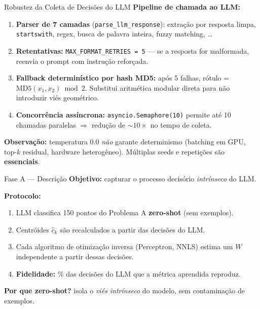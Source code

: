 \documentclass[aspectratio=169,10pt]{beamer}
\begin{document}
\begin{frame}{Robustez da Coleta de Decis\~oes do LLM}
  \footnotesize
  \textbf{Pipeline de chamada ao LLM:}
  \begin{enumerate}
    \item \textbf{Parser de 7 camadas} (\texttt{parse\_llm\_response}): extra\c{c}\~ao por resposta limpa, \texttt{startswith}, regex, busca de palavra inteira, fuzzy matching, \dots
    \item \textbf{Retentativas:} \texttt{MAX\_FORMAT\_RETRIES = 5} --- se a resposta for malformada, reenvia o prompt com instru\c{c}\~ao refor\c{c}ada.
    \item \textbf{Fallback determin\'istico por hash MD5:} ap\'os 5 falhas, r\'otulo = $\text{MD5}(x_1, x_2) \bmod 2$. Substitui aritm\'etica modular direta para n\~ao introduzir vi\'es geom\'etrico.
    \item \textbf{Concorr\^encia ass\'incrona:} \texttt{asyncio.Semaphore(10)} permite at\'e 10 chamadas paralelas $\Rightarrow$ redu\c{c}\~ao de $\sim 10\times$ no tempo de coleta.
  \end{enumerate}
  \bigskip

  \textbf{Observa\c{c}\~ao:} temperatura $0.0$ \emph{n\~ao} garante determinismo (batching em GPU, top-$k$ residual, hardware heterog\^eneo). M\'ultiplas seeds e repeti\c{c}\~oes s\~ao \textbf{essenciais}.
\end{frame}

\begin{frame}{Fase A --- Descri\c{c}\~ao}
  \textbf{Objetivo:} capturar o processo decis\'orio \emph{intr\'inseco} do LLM.
  \medskip

  \textbf{Protocolo:}
  \begin{enumerate}
    \item LLM classifica 150 pontos do Problema A \textbf{zero-shot} (sem exemplos).
    \item Centr\'oides $\hat{c}_k$ s\~ao recalculados a partir das decis\~oes do LLM.
    \item Cada algoritmo de otimiza\c{c}\~ao inversa (Perceptron, NNLS) estima um $W$ independente a partir dessas decis\~oes.
    \item \textbf{Fidelidade:} $\%$ das decis\~oes do LLM que a m\'etrica aprendida reproduz.
  \end{enumerate}
  \medskip

  \textbf{Por que zero-shot?} isola o \emph{vi\'es intr\'inseco} do modelo, sem contamina\c{c}\~ao de exemplos.
\end{frame}
\end{document}

